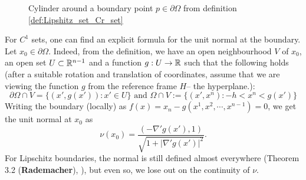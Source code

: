 \begin{figure}[H]
\caption{Cylinder around a boundary point $p\in \partial\Omega$ from definition \ref{def:Lipshitz_set_Cr_set}}
\label{fig:lipschitz_set}
\end{figure}

For $C^1$ sets, one can find an explicit formula for the unit normal at the boundary. Let $x_0\in \partial \Omega$. Indeed, from the definition, we have an open neighbourhood $V$ of $x_0$, an open set $U\subset \mathbb{R}^{n-1}$ and a function $g:U\to \mathbb{R}$ such that the following holds (after a suitable rotation and translation of coordinates, assume that we are viewing the function $g$ from the reference frame $H$-- the hyperplane.): $$\partial \Omega \cap V= \{(x',g(x')):x'\in U\} \text{ and }\Omega \cap V:=\{(x',x^n):-h<x^n<g(x')\} $$
Writing the boundary (locally) as $f(x)=x_n-g(x^1,x^2,\cdots,x^{n-1})=0$, we get the unit normal at $x_0$ as \begin{equation}\nu(x_0)=\frac{(-\nabla'g (x'),1)}{\sqrt{1+|\nabla'g (x')|^2}}. \end{equation}
For Lipschitz boundaries, the normal is still defined almost everywhere (Theorem 3.2 (\textbf{Rademacher}), \cite{EvansGariepy2015}), but even so, we lose out on the continuity of $\nu$.

